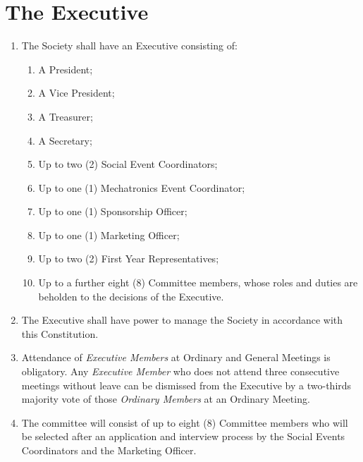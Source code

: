 \documentclass[11pt]{article}
\begin{document}
\section{The Executive}
\begin{enumerate}[\thesection .1]
    \item The Society shall have an Executive consisting of:
    \begin{enumerate}
        \item A President;
        \item A Vice President;
        \item A Treasurer;
        \item A Secretary;
        \item Up to two (2) Social Event Coordinators;
        \item Up to one (1) Mechatronics Event Coordinator;
        \item Up to one (1) Sponsorship Officer;
        \item Up to one (1) Marketing Officer;
        \item Up to two (2) First Year Representatives;
        \item Up to a further eight (8) Committee members, whose roles and duties are beholden to the decisions of the Executive.
    \end{enumerate}
    \item The Executive shall have power to manage the Society in accordance with this Constitution.
    \item Attendance of \textit{Executive Members} at Ordinary and General Meetings is obligatory. Any \textit{Executive Member} who does not attend three consecutive meetings without leave can be dismissed from the Executive by a two-thirds majority vote of those \textit{Ordinary Members} at an Ordinary Meeting.
    \item The committee will consist of up to eight (8) Committee members who will be selected after an application and interview process by the Social Events Coordinators and the Marketing Officer.
\end{enumerate}
\end{document}

